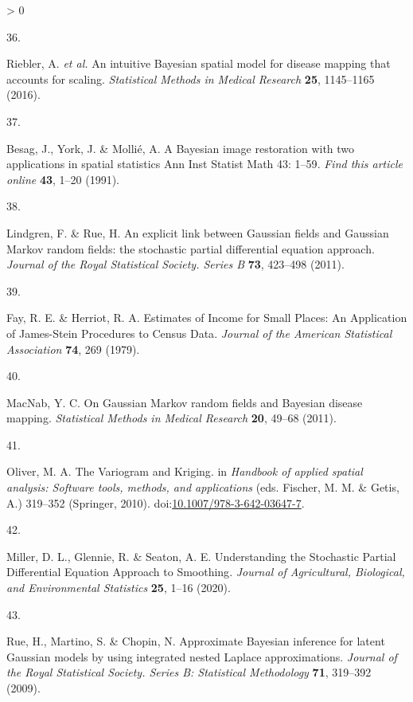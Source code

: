 \documentclass[
]{article}
\newlength{\cslhangindent}
\newlength{\csllabelwidth}
\newenvironment{CSLReferences}[2] %
 {%
  \setlength{\parindent}{0pt}
  \ifodd #1 \everypar{\setlength{\hangindent}{\cslhangindent}}\ignorespaces\fi
  \ifnum #2 > 0
  \setlength{\parskip}{#2\baselineskip}
  \fi
 }%
 {}
\newcommand{\CSLLeftMargin}[1]{\parbox[t]{\csllabelwidth}{#1}}
\newcommand{\CSLRightInline}[1]{\parbox[t]{\linewidth - \csllabelwidth}{#1}\break}
\begin{document}
\begin{CSLReferences}{0}{0}
\leavevmode\hypertarget{ref-Riebler2016}{}%
\CSLLeftMargin{36. }
\CSLRightInline{Riebler, A. \emph{et al.} {An intuitive Bayesian spatial model for disease mapping that accounts for scaling}. \emph{Statistical Methods in Medical Research} \textbf{25}, 1145--1165 (2016).}

\leavevmode\hypertarget{ref-Besag1991}{}%
\CSLLeftMargin{37. }
\CSLRightInline{Besag, J., York, J. \& Mollié, A. {A Bayesian image restoration with two applications in spatial statistics Ann Inst Statist Math 43: 1--59}. \emph{Find this article online} \textbf{43}, 1--20 (1991).}

\leavevmode\hypertarget{ref-Lindgren2011}{}%
\CSLLeftMargin{38. }
\CSLRightInline{Lindgren, F. \& Rue, H. {An explicit link between Gaussian fields and Gaussian Markov random fields: the stochastic partial differential equation approach}. \emph{Journal of the Royal Statistical Society. Series B} \textbf{73}, 423--498 (2011).}

\leavevmode\hypertarget{ref-III1979a}{}%
\CSLLeftMargin{39. }
\CSLRightInline{Fay, R. E. \& Herriot, R. A. {Estimates of Income for Small Places: An Application of James-Stein Procedures to Census Data}. \emph{Journal of the American Statistical Association} \textbf{74}, 269 (1979).}

\leavevmode\hypertarget{ref-MacNab2011}{}%
\CSLLeftMargin{40. }
\CSLRightInline{MacNab, Y. C. {On Gaussian Markov random fields and Bayesian disease mapping}. \emph{Statistical Methods in Medical Research} \textbf{20}, 49--68 (2011).}

\leavevmode\hypertarget{ref-Oliver2010}{}%
\CSLLeftMargin{41. }
\CSLRightInline{Oliver, M. A. {The Variogram and Kriging}. in \emph{Handbook of applied spatial analysis: Software tools, methods, and applications} (eds. Fischer, M. M. \& Getis, A.) 319--352 (Springer, 2010). doi:\href{https://doi.org/10.1007/978-3-642-03647-7}{10.1007/978-3-642-03647-7}.}

\leavevmode\hypertarget{ref-Miller2020}{}%
\CSLLeftMargin{42. }
\CSLRightInline{Miller, D. L., Glennie, R. \& Seaton, A. E. {Understanding the Stochastic Partial Differential Equation Approach to Smoothing}. \emph{Journal of Agricultural, Biological, and Environmental Statistics} \textbf{25}, 1--16 (2020).}

\leavevmode\hypertarget{ref-Rue2009}{}%
\CSLLeftMargin{43. }
\CSLRightInline{Rue, H., Martino, S. \& Chopin, N. {Approximate Bayesian inference for latent Gaussian models by using integrated nested Laplace approximations}. \emph{Journal of the Royal Statistical Society. Series B: Statistical Methodology} \textbf{71}, 319--392 (2009).}


\end{CSLReferences}
\end{document}
